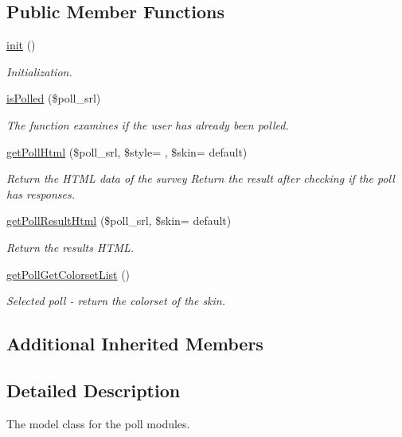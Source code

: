 \subsection*{Public Member Functions}
\begin{DoxyCompactItemize}
\item 
\hyperlink{classpollModel_a201866e44c1ba55917c57b15ae37f984}{init} ()
\begin{DoxyCompactList}\small\item\em Initialization. \end{DoxyCompactList}\item 
\hyperlink{classpollModel_a2364a327ffba2641db0722cdcf0c40d7}{is\+Polled} (\$poll\+\_\+srl)
\begin{DoxyCompactList}\small\item\em The function examines if the user has already been polled. \end{DoxyCompactList}\item 
\hyperlink{classpollModel_adf54e16d01ff98966cfc330c667b9898}{get\+Poll\+Html} (\$poll\+\_\+srl, \$style= \textquotesingle{}\textquotesingle{}, \$skin= \textquotesingle{}default\textquotesingle{})
\begin{DoxyCompactList}\small\item\em Return the H\+T\+M\+L data of the survey Return the result after checking if the poll has responses. \end{DoxyCompactList}\item 
\hyperlink{classpollModel_a2353dcbc141fa99d8fe05b223f738372}{get\+Poll\+Result\+Html} (\$poll\+\_\+srl, \$skin= \textquotesingle{}default\textquotesingle{})
\begin{DoxyCompactList}\small\item\em Return the result\textquotesingle{}s H\+T\+M\+L. \end{DoxyCompactList}\item 
\hyperlink{classpollModel_a350de71f668751cd553fc60aca3fa72c}{get\+Poll\+Get\+Colorset\+List} ()
\begin{DoxyCompactList}\small\item\em Selected poll -\/ return the colorset of the skin. \end{DoxyCompactList}\end{DoxyCompactItemize}
\subsection*{Additional Inherited Members}


\subsection{Detailed Description}
The model class for the poll modules. 

